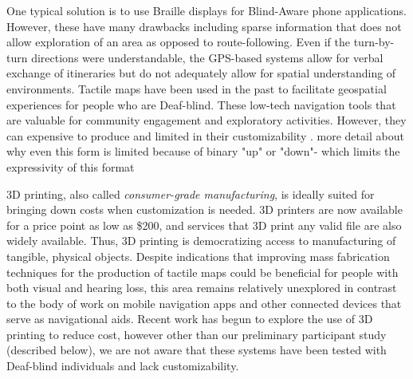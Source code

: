 One typical solution is to use Braille displays for Blind-Aware phone applications. However, these have many drawbacks including sparse information that does not allow exploration of an area as opposed to route-following.
Even if the turn-by-turn directions were understandable, the GPS-based systems allow for verbal exchange of itineraries but do not adequately allow for spatial understanding of environments. 
Tactile maps have been used in the past to facilitate geospatial experiences for people who are Deaf-blind. %
These low-tech navigation tools that are valuable for  community engagement and exploratory activities\cite{Ducasse2018}. However, they can  expensive to produce and limited in their customizability 
\cite{rice2005design}. 
\ac{more detail about why even this form is limited because of binary "up" or "down"- which limits the expressivity of this format}

3D printing, also called \textit{consumer-grade manufacturing}, is ideally suited for bringing down costs when customization is needed. 3D printers are now available for a price point as low as \$200, and services that 3D print any valid file are also widely available. Thus, 3D printing is democratizing access to manufacturing of tangible, physical objects. Despite indications that improving mass fabrication techniques for the production of tactile maps could be beneficial for people with both visual and hearing loss, this area remains relatively unexplored in contrast to the body of work on mobile navigation apps and other connected devices that serve as navigational aids.
Recent work has begun to explore the use of 3D printing to reduce cost, however other than our preliminary participant study (described below), we are not aware that these systems have been tested with Deaf-blind individuals and lack customizability. 


